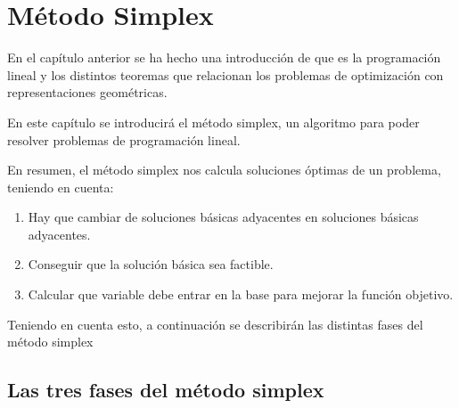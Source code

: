 \chapter{Método Simplex}
En el capítulo anterior se ha hecho una introducción de que es la
programación lineal y los distintos teoremas que relacionan los
problemas de optimización con representaciones geométricas.

En este capítulo se introducirá el método simplex, un algoritmo para
poder resolver problemas de programación lineal.

En resumen, el método simplex nos calcula soluciones óptimas de un
problema, teniendo en cuenta:

\begin{enumerate}
  \item Hay que cambiar de soluciones básicas adyacentes en soluciones
  básicas adyacentes.
  \item Conseguir que la solución básica sea factible.
  \item Calcular que variable debe entrar en la base para mejorar la
  función objetivo.
\end{enumerate}

Teniendo en cuenta esto, a continuación se describirán las distintas
fases del método simplex
\section{Las tres fases del método simplex}

